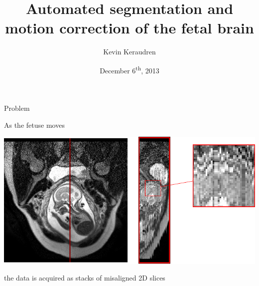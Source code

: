 \documentclass[12pt]{beamer}
\title[]{Automated segmentation and motion correction of the fetal brain}
\author[K. Keraudren]{Kevin Keraudren}
\date{December 6\textsuperscript{th}, 2013}
\institute[ICL]{Imperial College London}
\begin{document}

\begin{frame}[plain]
	\titlepage
\end{frame}


\begin{frame}{Problem}
\centering

As the fetuse moves

\vspace{0.02\textheight}

\includegraphics[width=\textwidth]{XY_plane_all.pdf}

the data is acquired as stacks of misaligned 2D slices

\end{frame}
\end{document}
